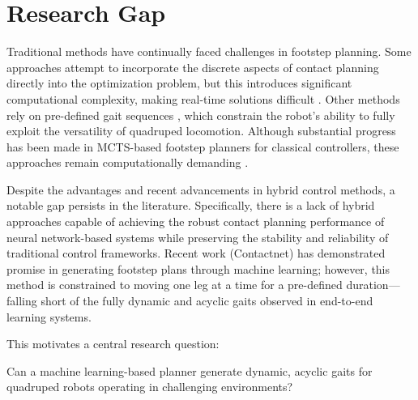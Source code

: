 \section{Research Gap}

Traditional methods have continually faced challenges in footstep
planning. Some approaches attempt to incorporate the discrete aspects
of contact planning directly into the optimization problem,
but this introduces significant computational complexity, making
real-time solutions difficult \cite{winkler_gait_2018}. Other methods
rely on pre-defined gait
sequences
\cite{xie_glide_2023, grandia_perceptive_2022, lee_learning_2020,
villarreal_fast_2019},
which constrain the robot's
ability to fully exploit the versatility of quadruped locomotion.
Although substantial progress has been made in MCTS-based footstep
planners for classical controllers, these approaches remain
computationally demanding \cite{amatucci_monte_2022, taouil_non-gaited_2025}.

Despite the advantages and recent advancements in hybrid control
methods, a notable gap persists in the literature. Specifically,
there is a lack of hybrid approaches capable of achieving the robust
contact planning performance of neural network-based systems while
preserving the stability and reliability of traditional control
frameworks. Recent work (Contactnet) has demonstrated promise in
generating footstep plans through machine learning; however, this
method is constrained to moving one leg at a time for a pre-defined
duration—falling short of the fully dynamic and acyclic gaits
observed in end-to-end learning systems.

This motivates a central research question:

\begin{emphasis}
  Can a machine learning-based planner generate dynamic, acyclic
  gaits for quadruped robots operating in challenging environments?
\end{emphasis}
